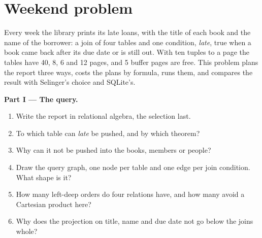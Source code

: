 \section{Weekend problem}\label{sec:b3:query-optimisation:problem}

\begin{problem}\label{pb:b3:query-optimisation:1}
Every week the library prints its late loans, with the title of each book and the name of the borrower: a join of four tables and one condition, \emph{late}, true when a book came back after its due date or is still out. With ten tuples to a page the tables have 40, 8, 6 and 12 pages, and 5 buffer pages are free. This problem plans the report three ways, costs the plans by formula, runs them, and compares the result with Selinger's choice and SQLite's.

\label{lst:b3:query-optimisation:overdue}

\label{out:b3:query-optimisation:overdue}

\medskip\noindent\textbf{Part I --- The query.}
\begin{enumerate}
  \item Write the report in relational algebra, the selection last.
  \item To which table can \emph{late} be pushed, and by which theorem?
  \item Why can it not be pushed into the books, members or people?
  \item Draw the query graph, one node per table and one edge per join condition. What shape is it?
  \item How many left-deep orders do four relations have, and how many avoid a Cartesian product here?
  \item Why does the projection on title, name and due date not go below the joins whole?
\end{enumerate}


\end{problem}
